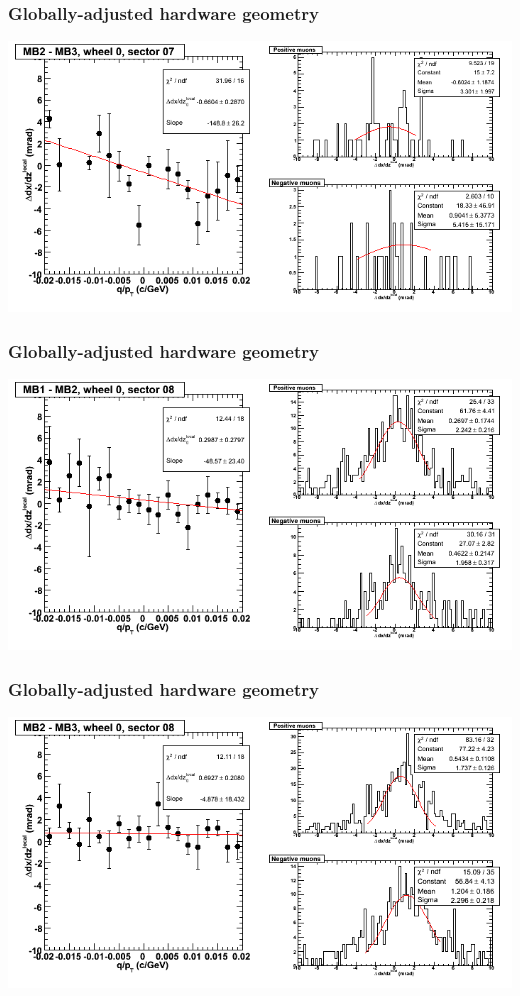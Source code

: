 \documentclass[compress]{beamer}
\begin{document}
\begin{frame}
\frametitle{Globally-adjusted hardware geometry}
\includegraphics[width=\linewidth]{NOV4_segdiffs_HW/dt13_slope_C_07_23.png}
\end{frame}

\begin{frame}
\frametitle{Globally-adjusted hardware geometry}
\includegraphics[width=\linewidth]{NOV4_segdiffs_HW/dt13_slope_C_08_12.png}
\end{frame}

\begin{frame}
\frametitle{Globally-adjusted hardware geometry}
\includegraphics[width=\linewidth]{NOV4_segdiffs_HW/dt13_slope_C_08_23.png}
\end{frame}
\end{document}
